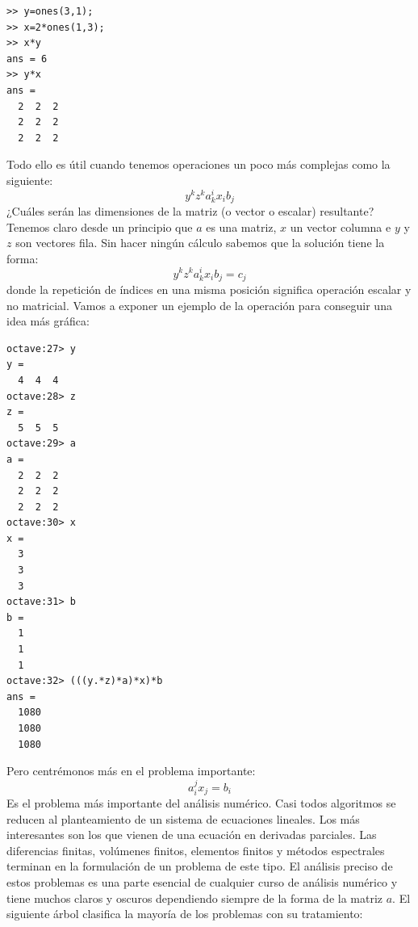   \begin{verbatim}
>> y=ones(3,1);
>> x=2*ones(1,3);
>> x*y
ans = 6
>> y*x
ans =
  2  2  2
  2  2  2
  2  2  2
 \end{verbatim}
Todo ello es útil cuando tenemos operaciones un poco más complejas
como la siguiente:
$$y^{k}z^{k}a_{k}^{i}x_{i}b_{j}$$
¿Cuáles serán las dimensiones de la matriz (o vector o escalar) resultante?
Tenemos claro desde un principio que $a$ es una matriz, $x$ un vector
columna e $y$ y $z$ son vectores fila. Sin hacer ningún cálculo
sabemos que la solución tiene la forma:
$$y^{k}z^{k}a_{k}^{i}x_{i}b_{j}=c_{j}$$
donde la repetición de índices en una misma posición significa operación
escalar y no matricial. Vamos a exponer un ejemplo de la operación
para conseguir una idea más gráfica:

  \begin{verbatim}
octave:27> y
y =
  4  4  4
octave:28> z
z =
  5  5  5
octave:29> a
a =
  2  2  2
  2  2  2
  2  2  2
octave:30> x
x =
  3
  3
  3
octave:31> b
b =
  1
  1
  1
octave:32> (((y.*z)*a)*x)*b
ans =
  1080
  1080
  1080
 \end{verbatim}
Pero centrémonos más en el problema importante:
$$a_{i}^{j}x_{j}=b_{i}$$
Es el problema más importante del análisis numérico. Casi todos algoritmos
se reducen al planteamiento de un sistema de ecuaciones lineales.
Los más interesantes son los que vienen de una ecuación en derivadas
parciales. Las diferencias finitas, volúmenes finitos, elementos finitos
y métodos espectrales terminan en la formulación de un problema de
este tipo. El análisis preciso de estos problemas es una parte esencial
de cualquier curso de análisis numérico y tiene muchos claros y oscuros
dependiendo siempre de la forma de la matriz $a$. El siguiente árbol
clasifica la mayoría de los problemas con su tratamiento:

